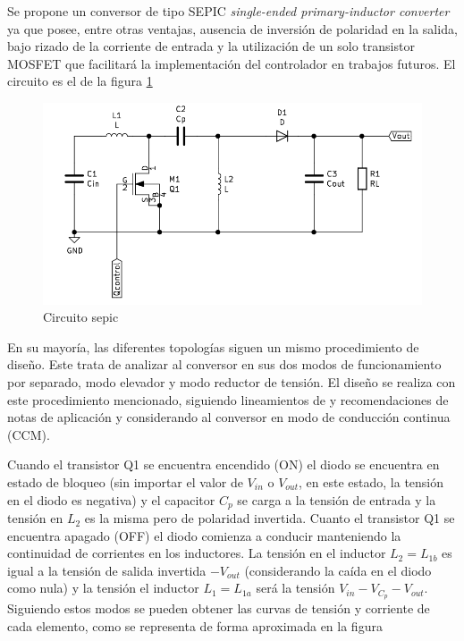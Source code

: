     Se propone un conversor de tipo SEPIC \textit{single-ended primary-inductor converter} ya que posee, entre otras ventajas, ausencia de inversión de polaridad en la salida, bajo rizado de la corriente de entrada \cite{alvarez2019caracterizacion} y la utilización de un solo transistor MOSFET que facilitará la implementación del controlador en trabajos futuros. El circuito es el de la figura \ref{fig: Circuito sepic}
    \begin{figure}
        \centering
         \includegraphics[scale = 0.25]{Figuras/Circuito_BB.png}
        \caption{Circuito sepic}
        \label{fig: Circuito sepic}
    \end{figure}
       
      
    En su mayoría, las diferentes topologías siguen un mismo procedimiento de diseño. Este trata de analizar al  conversor en sus dos modos de funcionamiento por separado, modo elevador y modo reductor de tensión. El diseño se realiza con este procedimiento mencionado, siguiendo lineamientos de \cite{espinosa2017asynchronous} y recomendaciones de notas de aplicación \cite{haifengdesign} y \cite{falin2008designing} considerando al conversor en modo de conducción continua (CCM). 
    
    
    Cuando el transistor Q1 se encuentra encendido (ON) el diodo se encuentra en estado de bloqueo (sin importar el valor de $V_{in}$ o $V_{out}$, en este estado, la tensión en el diodo es negativa) y el capacitor $C_p$ se carga a la tensión de entrada y la tensión en $L_2$ es la misma pero de polaridad invertida. Cuanto el transistor Q1 se encuentra apagado (OFF) el diodo comienza a conducir manteniendo la continuidad de corrientes en los inductores. La tensión en el inductor $L_2 = L_{1b}$ es igual a la tensión de salida invertida $-V_{out}$ (considerando la caída en el diodo como nula) y la tensión el inductor $L_1 = L_{1a}$ será la tensión $V_{in} - V_{C_p} - V_{out}$. Siguiendo estos modos se pueden obtener las curvas de tensión y corriente de cada elemento, como se representa de forma aproximada en la figura 
  
